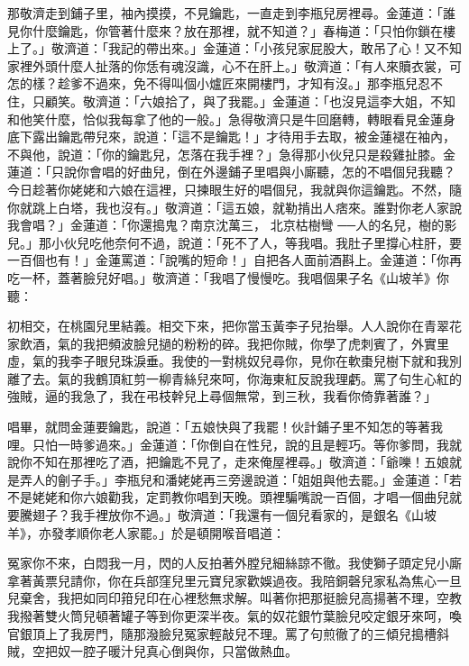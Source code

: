 \begin{showcontents}{}
那敬濟走到鋪子里，袖內摸摸，不見鑰匙，一直走到李瓶兒房裡尋。金蓮道：「誰見你什麼鑰匙，你管著什麼來？放在那裡，就不知道？」春梅道：「只怕你鎖在樓上了。」敬濟道：「我記的帶出來。」金蓮道：「小孩兒家屁股大，敢吊了心！又不知家裡外頭什麼人扯落的你恁有魂沒識，心不在肝上。」敬濟道：「有人來贖衣裳，可怎的樣？趁爹不過來，免不得叫個小爐匠來開樓門，才知有沒。」那李瓶兒忍不住，只顧笑。敬濟道：「六娘拾了，與了我罷。」金蓮道：「也沒見這李大姐，不知和他笑什麼，恰似我每拿了他的一般。」急得敬濟只是牛回磨轉，轉眼看見金蓮身底下露出鑰匙帶兒來，說道：「這不是鑰匙！」才待用手去取，被金蓮褪在袖內，不與他，說道：「你的鑰匙兒，怎落在我手裡？」急得那小伙兒只是殺雞扯膝。金蓮道：「只說你會唱的好曲兒，倒在外邊鋪子里唱與小廝聽，怎的不唱個兒我聽？今日趁著你姥姥和六娘在這裡，只揀眼生好的唱個兒，我就與你這鑰匙。不然，隨你就跳上白塔，我也沒有。」敬濟道：「這五娘，就勒掯出人痞來。誰對你老人家說我會唱？」金蓮道：「你還搗鬼？南京沈萬三，
北京枯樹彎
──人的名兒，樹的影兒。」那小伙兒吃他奈何不過，說道：「死不了人，等我唱。我肚子里撐心柱肝，要一百個也有！」金蓮罵道：「說嘴的短命！」自把各人面前酒斟上。金蓮道：「你再吃一杯，蓋著臉兒好唱。」敬濟道：「我唱了慢慢吃。我唱個果子名《山坡羊》你聽：

初相交，在桃園兒里結義。相交下來，把你當玉黃李子兒抬舉。人人說你在青翠花家飲酒，氣的我把頻波臉兒撾的粉粉的碎。我把你賊，你學了虎刺賓了，外實里虛，氣的我李子眼兒珠淚垂。我使的一對桃奴兒尋你，見你在軟棗兒樹下就和我別離了去。氣的我鶴頂紅剪一柳青絲兒來呵，你海東紅反說我理虧。罵了句生心紅的強賊，逼的我急了，我在弔枝幹兒上尋個無常，到三秋，我看你倚靠著誰？」

唱畢，就問金蓮要鑰匙，說道：「五娘快與了我罷！伙計鋪子里不知怎的等著我哩。只怕一時爹過來。」金蓮道：「你倒自在性兒，說的且是輕巧。等你爹問，我就說你不知在那裡吃了酒，把鑰匙不見了，走來俺屋裡尋。」敬濟道：「爺嚛！五娘就是弄人的劊子手。」李瓶兒和潘姥姥再三旁邊說道：「姐姐與他去罷。」金蓮道：「若不是姥姥和你六娘勸我，定罰教你唱到天晚。頭裡騙嘴說一百個，才唱一個曲兒就要騰翅子？我手裡放你不過。」敬濟道：「我還有一個兒看家的，是銀名《山坡羊》，亦發孝順你老人家罷。」於是頓開喉音唱道：

冤家你不來，白悶我一月，閃的人反拍著外膛兒細絲諒不徹。我使獅子頭定兒小廝拿著黃票兒請你，你在兵部窪兒里元寶兒家歡娛過夜。我陪銅磬兒家私為焦心一旦兒棄舍，我把如同印箝兒印在心裡愁無求解。叫著你把那挺臉兒高揚著不理，空教我撥著雙火筒兒頓著罐子等到你更深半夜。氣的奴花銀竹葉臉兒咬定銀牙來呵，喚官銀頂上了我房門，隨那潑臉兒冤家輕敲兒不理。罵了句煎徹了的三傾兒搗槽斜賊，空把奴一腔子暖汁兒真心倒與你，只當做熱血。


\end{showcontents}
